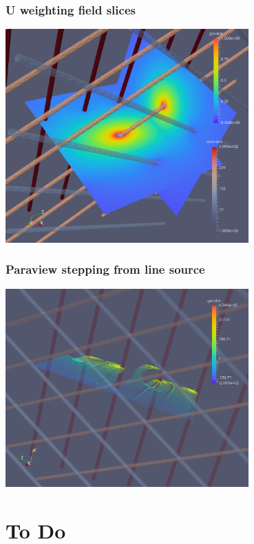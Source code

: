 \documentclass[xcolor=dvipsnames]{beamer}
\begin{document}
\begin{frame}
  \frametitle{U weighting field slices}
  \begin{center}
      \includegraphics[width=0.7\textwidth]{cap-vweight-field-fine-slices.png}
  \end{center}
\end{frame}

\begin{frame}
  \frametitle{Paraview stepping from line source}
  \begin{center}
      \includegraphics[width=0.7\textwidth]{track-drift-2.png}
  \end{center}
\end{frame}

\section{To Do}
\end{document}
